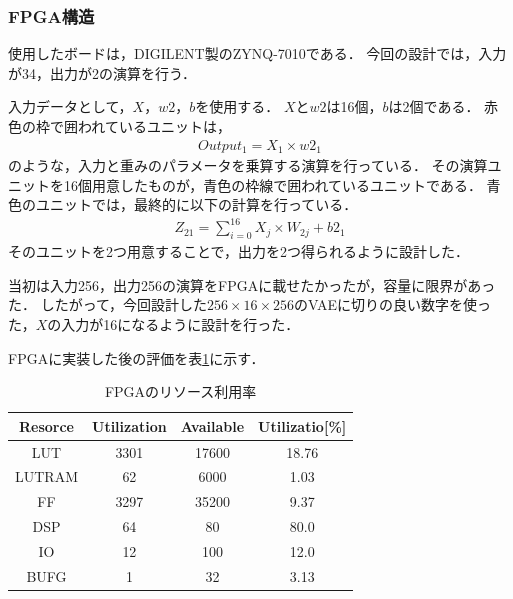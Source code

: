\documentclass[paper]{ieicej}
\begin{document}
\subsubsection{FPGA構造}\label{2.2.4}
使用したボードは，DIGILENT製のZYNQ-7010である．
今回の設計では，入力が34，出力が2の演算を行う．

入力データとして，$X$，$w2$，$b$を使用する．
$X$と$w2$は16個，$b$は2個である．
赤色の枠で囲われているユニットは，
\begin{align}
  Output_1 = X_1 \times w2_1
\end{align}
のような，入力と重みのパラメータを乗算する演算を行っている．
その演算ユニットを16個用意したものが，青色の枠線で囲われているユニットである．
青色のユニットでは，最終的に以下の計算を行っている．
\begin{align}
  Z_{21} = \sum_{i = 0}^{16} X_j \times W_{2j} + b2_1
\end{align}
そのユニットを2つ用意することで，出力を2つ得られるように設計した．

当初は入力256，出力256の演算をFPGAに載せたかったが，容量に限界があった．
したがって，今回設計した$256\times16\times256$のVAEに切りの良い数字を使った，$X$の入力が16になるように設計を行った．

FPGAに実装した後の評価を表\ref{tb:3}に示す．

\begin{table}[tb]
  \centering
  \caption{FPGAのリソース利用率}
  \small
  \begin{tabular}{|c|c|c|c|} \hline
    Resorce & Utilization & Available & Utilizatio[\%]\\ \hline
    LUT & 3301 & 17600 & 18.76 \\ \hline
    LUTRAM & 62 & 6000 & 1.03 \\ \hline
    FF & 3297 & 35200 & 9.37 \\ \hline
    DSP & 64 & 80 & 80.0 \\ \hline
    IO & 12 & 100 & 12.0 \\ \hline
    BUFG & 1 & 32 & 3.13 \\ \hline
  \end{tabular}
  \label{tb:3}
\end{table}
\end{document}
